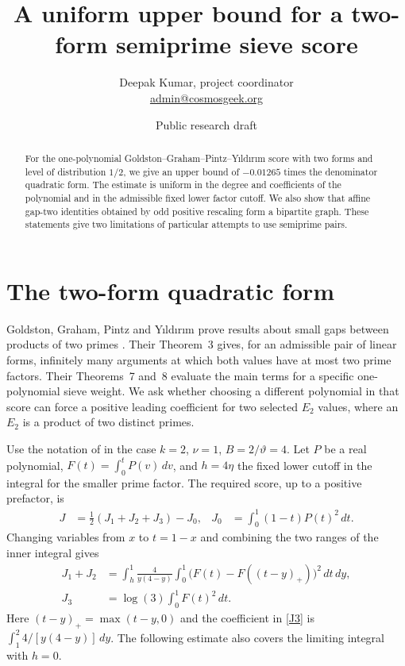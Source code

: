 \documentclass[11pt]{article}
\title{A uniform upper bound for a two-form semiprime sieve score}
\author{Deepak Kumar, project coordinator\\
\small\href{mailto:admin@cosmosgeek.org}{admin@cosmosgeek.org}}
\date{Public research draft}
\begin{document}
\maketitle
\begin{abstract}
For the one-polynomial Goldston--Graham--Pintz--Y{\i}ld{\i}r{\i}m
score with two forms and level of distribution $1/2$, we give an
upper bound of $-0.01265$ times the denominator quadratic form.
The estimate is uniform in the degree and coefficients of the
polynomial and in the admissible fixed lower factor cutoff.
We also show that affine gap-two identities obtained by odd
positive rescaling form a bipartite graph. These statements give
two limitations of particular attempts to use semiprime pairs.
\end{abstract}

\section{The two-form quadratic form}
Goldston, Graham, Pintz and Y{\i}ld{\i}r{\i}m prove results about
small gaps between products of two primes \cite{GGPY}. Their Theorem~3
gives, for an admissible pair of linear forms, infinitely many
arguments at which both values have at most two prime factors.
Their Theorems~7 and~8 evaluate the main terms for a specific
one-polynomial sieve weight. We ask whether choosing a different
polynomial in that score can force a positive leading coefficient
for two selected $E_2$ values, where an $E_2$ is a product of two
distinct primes.

Use the notation of \cite[Thms.~7--8 and \S8, (8.1)]{GGPY} in the
case $k=2$, $\nu=1$, $B=2/\vartheta=4$. Let $P$ be a real polynomial,
$F(t)=\int_0^tP(v)\,dv$, and $h=4\eta$ the fixed lower cutoff
in the integral for the smaller prime factor. The required score,
up to a positive prefactor, is
\begin{align}
J&=\tfrac12(J_1+J_2+J_3)-J_0,
&J_0&=\int_0^1(1-t)P(t)^2\,dt . \label{score}
\end{align}
Changing variables from $x$ to $t=1-x$ and combining the two
ranges of the inner integral gives
\begin{align}
J_1+J_2
 &=\int_h^1\frac{4}{y(4-y)}
       \int_0^1\bigl(F(t)-F((t-y)_+)\bigr)^2\,dt\,dy, \label{diff}\\
J_3&=\log(3)\int_0^1 F(t)^2\,dt. \label{J3}
\end{align}
Here $(t-y)_+=\max(t-y,0)$ and the coefficient in \eqref{J3} is
$\int_1^2 4/[y(4-y)]\,dy$. The following estimate also covers
the limiting integral with $h=0$.
\end{document}
